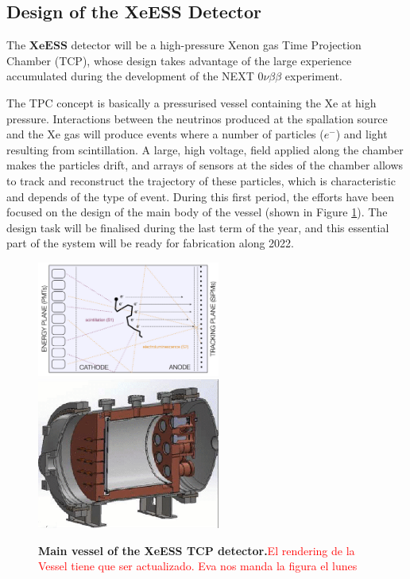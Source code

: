 \documentclass[12pt,a4paper,article]{report} %
\begin{document}
\subsection*{Design of the XeESS Detector}

The $\mathbf{XeESS}$ detector will be a high-pressure Xenon gas Time Projection Chamber (TCP), whose design takes advantage of the large experience accumulated during the development of the NEXT $0\nu\beta\beta$ experiment. 

The TPC concept is basically a pressurised vessel containing the Xe at high pressure. Interactions between the neutrinos produced at the spallation source and the Xe gas will  produce  events where a number of particles ($e^{-}$) and light resulting from scintillation. A large, high voltage, field applied along the chamber makes the particles drift, and arrays of sensors at the sides of the chamber allows to track and reconstruct the trajectory of these particles, which is characteristic and depends of the type of event.  During this first period, the efforts have been focused on the design of the main body of the vessel (shown in Figure \ref{chamber}). The design task will be finalised during the last term of the year, and this essential part of the system will be ready for fabrication along 2022.

\begin{figure}[htbp]
\begin{center}
\includegraphics[width=6cm]{chamber}\includegraphics[width=6cm]{chamber2}
\caption{\textbf{Main vessel of the XeESS TCP detector.}\textcolor{red}{El rendering de la Vessel tiene que ser actualizado. Eva nos manda la figura el lunes}}
\label{chamber}
\end{center}
\end{figure}
\end{document}
